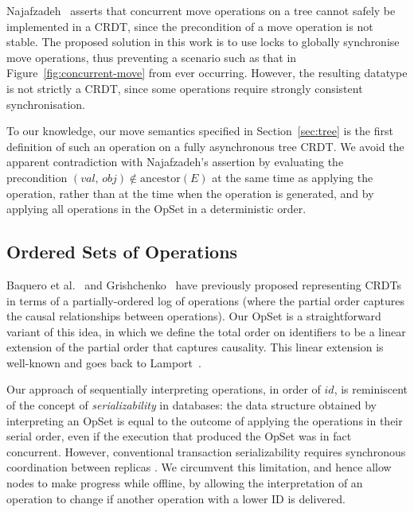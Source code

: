 Najafzadeh~\cite{Najafzadeh:2017vk} asserts that concurrent move operations on a tree cannot safely be implemented in a CRDT, since the precondition of a move operation is not stable.
The proposed solution in this work is to use locks to globally synchronise move operations, thus preventing a scenario such as that in Figure~\ref{fig:concurrent-move} from ever occurring.
However, the resulting datatype is not strictly a CRDT, since some operations require strongly consistent synchronisation.

To our knowledge, our move semantics specified in Section~\ref{sec:tree} is the first definition of such an operation on a fully asynchronous tree CRDT.
We avoid the apparent contradiction with Najafzadeh's assertion by evaluating the precondition $(\mathit{val},\, \mathit{obj}) \notin \mathrm{ancestor}(E)$ at the same time as applying the operation, rather than at the time when the operation is generated, and by applying all operations in the OpSet in a deterministic order.

\subsection{Ordered Sets of Operations}

Baquero et al.~\cite{Baquero:2014ed} and Grishchenko~\cite{Grishchenko:2014eh} have previously proposed representing CRDTs in terms of a partially-ordered log of operations (where the partial order captures the causal relationships between operations).
Our OpSet is a straightforward variant of this idea, in which we define the total order on identifiers to be a linear extension of the partial order that captures causality.
This linear extension is well-known and goes back to Lamport~\cite{Lamport:1978jq}.

Our approach of sequentially interpreting operations, in order of $\mathit{id}$, is reminiscent of the concept of \emph{serializability} in databases: the data structure obtained by interpreting an OpSet is equal to the outcome of applying the operations in their serial order, even if the execution that produced the OpSet was in fact concurrent.
However, conventional transaction serializability requires synchronous coordination between replicas \cite{Davidson:1985hv}.
We circumvent this limitation, and hence allow nodes to make progress while offline, by allowing the interpretation of an operation to change if another operation with a lower ID is delivered.
